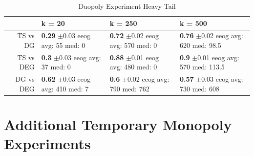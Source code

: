 \documentclass[11pt,letterpaper]{article}
\begin{document}
\begin{table}[H]
\centering
\caption{Duopoly Experiment Heavy Tail} 
\begin{tabular}{rlll}
  \hline
 & k = 20 & k = 250 & k = 500 \\ 
  \hline
TS vs DG & \makecell{\textbf{0.29} $\pm$0.03\\ eeog \\ avg: 55\\ med: 0} & \makecell{\textbf{0.72} $\pm$0.02\\ eeog \\ avg: 570\\ med: 0} & \makecell{\textbf{0.76} $\pm$0.02\\ eeog \\ avg: 620\\ med: 98.5} \\ 
  TS vs DEG & \makecell{\textbf{0.3} $\pm$0.03\\ eeog \\ avg: 37\\ med: 0} & \makecell{\textbf{0.88} $\pm$0.01\\ eeog \\ avg: 480\\ med: 0} & \makecell{\textbf{0.9} $\pm$0.01\\ eeog \\ avg: 570\\ med: 113.5} \\ 
  DG vs DEG & \makecell{\textbf{0.62} $\pm$0.03\\ eeog \\ avg: 410\\ med: 7} & \makecell{\textbf{0.6} $\pm$0.02\\ eeog \\ avg: 790\\ med: 762} & \makecell{\textbf{0.57} $\pm$0.03\\ eeog \\ avg: 730\\ med: 608} \\ 
   \hline
\end{tabular}
\label{sim_ht}
\end{table}

\newpage

\section{Additional Temporary Monopoly Experiments}
\end{document}
